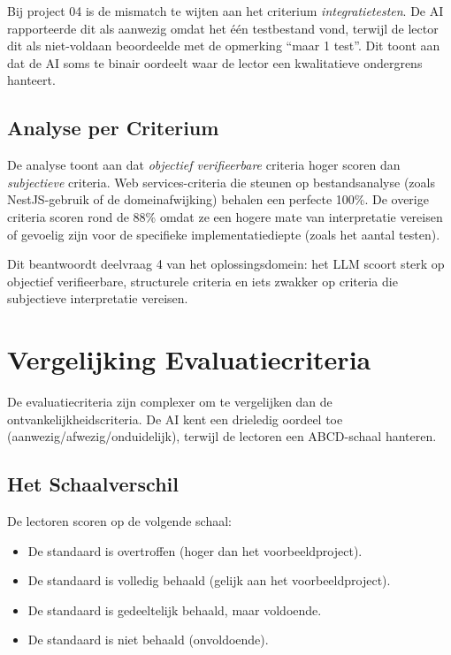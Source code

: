 \vspace{1em}

Bij project 04 is de mismatch te wijten aan het criterium \textit{integratietesten}. De AI rapporteerde dit als aanwezig omdat het één testbestand vond, terwijl de lector dit als niet-voldaan beoordeelde met de opmerking ``maar 1 test''. Dit toont aan dat de AI soms te binair oordeelt waar de lector een kwalitatieve ondergrens hanteert.

\subsection{Analyse per Criterium}

De analyse toont aan dat \textit{objectief verifieerbare} criteria hoger scoren dan \textit{subjectieve} criteria. Web services-criteria die steunen op bestandsanalyse (zoals NestJS-gebruik of de domeinafwijking) behalen een perfecte 100\%. De overige criteria scoren rond de 88\% omdat ze een hogere mate van interpretatie vereisen of gevoelig zijn voor de specifieke implementatiediepte (zoals het aantal testen).

\vspace{1em}

Dit beantwoordt deelvraag 4 van het oplossingsdomein: het LLM scoort sterk op objectief verifieerbare, structurele criteria en iets zwakker op criteria die subjectieve interpretatie vereisen.

\section{Vergelijking Evaluatiecriteria}
\label{sec:eval-vergelijking}

De evaluatiecriteria zijn complexer om te vergelijken dan de ontvankelijkheidscriteria. De AI kent een drieledig oordeel toe (aanwezig/afwezig/onduidelijk), terwijl de lectoren een ABCD-schaal hanteren.

\subsection{Het Schaalverschil}

De lectoren scoren op de volgende schaal:
\begin{itemize}
    \item[\textbf{A}] De standaard is overtroffen (hoger dan het voorbeeldproject).
    \item[\textbf{B}] De standaard is volledig behaald (gelijk aan het voorbeeldproject).
    \item[\textbf{C}] De standaard is gedeeltelijk behaald, maar voldoende.
    \item[\textbf{D}] De standaard is niet behaald (onvoldoende).
\end{itemize}

